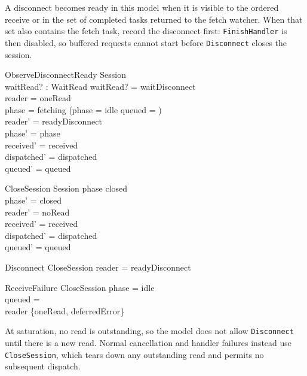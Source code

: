 \documentclass[a4paper,10pt,fleqn]{article}
\begin{document}
A disconnect becomes ready in this model when it is visible to the
ordered receive or in the set of completed tasks returned to the fetch
watcher. When that set also contains the fetch task, record the disconnect
first: \texttt{FinishHandler} is then disabled, so buffered requests
cannot start before \texttt{Disconnect} closes the session.

\begin{schema}{ObserveDisconnectReady}
  \Delta Session \\
  waitRead? : WaitRead
  \where
  waitRead? = waitDisconnect \\
  reader = oneRead \\
  phase = fetching \lor (phase = idle \land queued = \langle \rangle) \\
  reader' = readyDisconnect \\
  phase' = phase \\
  received' = received \\
  dispatched' = dispatched \\
  queued' = queued
\end{schema}

\begin{schema}{CloseSession}
  \Delta Session
  \where
  phase \neq closed \\
  phase' = closed \\
  reader' = noRead \\
  received' = received \\
  dispatched' = dispatched \\
  queued' = queued
\end{schema}

\begin{schema}{Disconnect}
  CloseSession
  \where
  reader = readyDisconnect
\end{schema}

\begin{schema}{ReceiveFailure}
  CloseSession
  \where
  phase = idle \\
  queued = \langle \rangle \\
  reader \in \{oneRead, deferredError\}
\end{schema}

At saturation, no read is outstanding, so the model does not allow
\texttt{Disconnect} until there is a new read. Normal cancellation and
handler failures instead use \texttt{CloseSession}, which tears down any
outstanding read and permits no subsequent dispatch.
\end{document}
